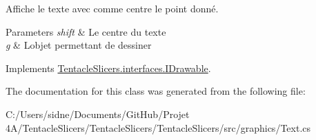 Affiche le texte avec comme centre le point donné. 


\begin{DoxyParams}{Parameters}
{\em shift} & Le centre du texte \\
\hline
{\em g} & L\textquotesingle{}objet permettant de dessiner \\
\hline
\end{DoxyParams}


Implements \hyperlink{interface_tentacle_slicers_1_1interfaces_1_1_i_drawable}{Tentacle\+Slicers.\+interfaces.\+I\+Drawable}.



The documentation for this class was generated from the following file\+:\begin{DoxyCompactItemize}
\item 
C\+:/\+Users/sidne/\+Documents/\+Git\+Hub/\+Projet 4\+A/\+Tentacle\+Slicers/\+Tentacle\+Slicers/\+Tentacle\+Slicers/src/graphics/Text.\+cs\end{DoxyCompactItemize}
